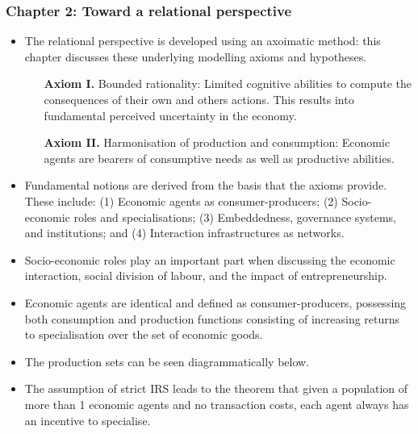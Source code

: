 \documentclass[10pt]{beamer}
\begin{document}
\begin{frame} \frametitle{Chapter 2: Toward a relational perspective}
\begin{itemize}
\item The relational perspective is developed using an axoimatic method: this chapter discusses these underlying modelling axioms and hypotheses.
\begin{itemize}
\medskip
\item[\textbf{Axiom I.}] Bounded rationality: Limited cognitive abilities to compute the consequences of their own and others actions. This
results into fundamental perceived uncertainty in the economy.
\medskip
\item[\textbf{Axiom II.}] Harmonisation of production and consumption: Economic agents are bearers of consumptive needs as well as productive abilities.
\end{itemize}
\medskip
\item Fundamental notions are derived from the basis that the axioms provide. These include: (1) Economic agents as consumer-producers; (2) Socio-economic roles and specialisations; (3) Embeddedness, governance systems, and institutions; and (4) Interaction infrastructures as networks.
\medskip
\item Socio-economic roles play an important part when discussing the economic interaction, social division of labour, and the impact of entrepreneurship.
\end{itemize}
\end{frame}


\begin{frame} %
\begin{itemize}
\item Economic agents are identical and defined as consumer-producers, possessing both consumption and production functions consisting of increasing returns to specialisation over the set of economic goods.
\medskip
\item The production sets can be seen diagrammatically below.
\medskip
\item The assumption of strict IRS leads to the theorem that given a population of more than 1 economic agents and no transaction costs, each agent always has an incentive to specialise.
\end{itemize}
\end{frame}
\end{document}
